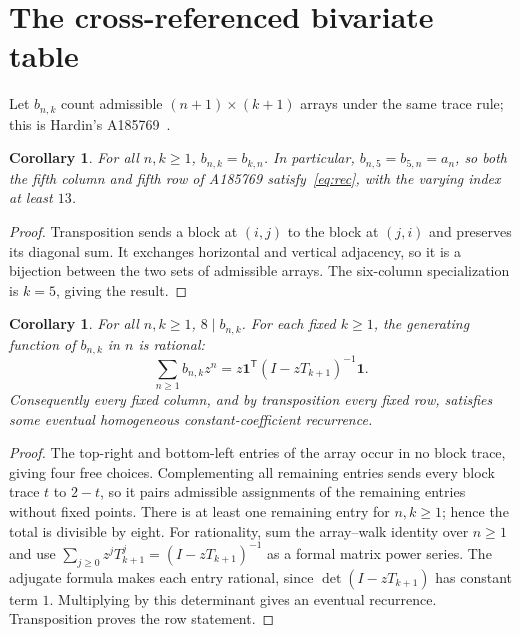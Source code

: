 \documentclass[11pt]{article}
\newtheorem{corollary}[theorem]{Corollary}
\begin{document}
\section{The cross-referenced bivariate table}
Let $b_{n,k}$ count admissible $(n+1)\times(k+1)$ arrays under the same
trace rule; this is Hardin's A185769~\cite{hardin769}.
\begin{corollary}\label{cor:transpose}
For all $n,k\geq1$, $b_{n,k}=b_{k,n}$. In particular,
$b_{n,5}=b_{5,n}=a_n$, so both the fifth column and fifth row of
A185769 satisfy~\eqref{eq:rec}, with the varying index at least $13$.
\end{corollary}
\begin{proof}
Transposition sends a block at $(i,j)$ to the block at $(j,i)$ and
preserves its diagonal sum. It exchanges horizontal and vertical
adjacency, so it is a bijection between the two sets of admissible
arrays. The six-column specialization is $k=5$, giving the result.
\end{proof}

\begin{corollary}\label{cor:general}
For all $n,k\geq1$, $8\mid b_{n,k}$. For each fixed $k\geq1$,
the generating function of $b_{n,k}$ in $n$ is rational:
\[
 \sum_{n\geq1}b_{n,k}z^n
 =z\mathbf1^{\mathsf T}(I-zT_{k+1})^{-1}\mathbf1.
\]
Consequently every fixed column, and by transposition every fixed row,
satisfies some eventual homogeneous constant-coefficient recurrence.
\end{corollary}
\begin{proof}
The top-right and bottom-left entries of the array occur in no block
trace, giving four free choices. Complementing all remaining entries
sends every block trace $t$ to $2-t$, so it pairs admissible assignments
of the remaining entries without fixed points. There is at least one
remaining entry for $n,k\geq1$; hence the total is divisible by eight.
For rationality, sum the array--walk identity over $n\geq1$ and use
$\sum_{j\geq0}z^jT_{k+1}^j=(I-zT_{k+1})^{-1}$ as a formal matrix
power series. The adjugate formula makes each entry rational, since
$\det(I-zT_{k+1})$ has constant term $1$. Multiplying by this determinant
gives an eventual recurrence. Transposition proves the row statement.
\end{proof}
\end{document}
